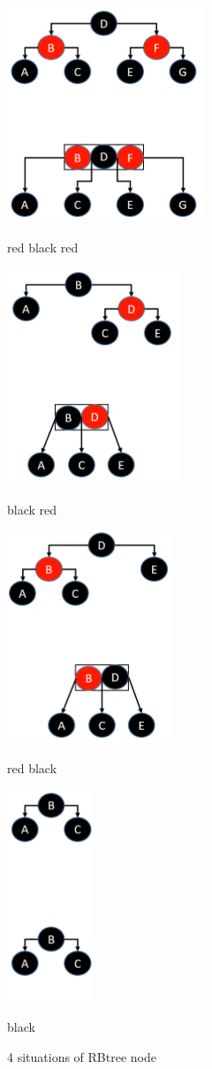\documentclass{article}
\begin{document}
\begin{figure}[htbp]
    \centering

    \begin{minipage}{0.49\linewidth}
        \centering
        \includegraphics[height = 90 pt]{rbr.png}
        \caption{red black red}
        \label{rbr}
    \end{minipage}
    \begin{minipage}{0.49\linewidth}
        \centering
        \includegraphics[height = 90 pt]{br.png}
        \caption{black red}
        \label{br}
    \end{minipage}

    \begin{minipage}{0.49\linewidth}
        \centering
        \includegraphics[height = 90 pt]{rb.png}
        \caption{red black}
        \label{rb}
    \end{minipage}
    \begin{minipage}{0.49\linewidth}
        \centering
        \includegraphics[height = 90 pt]{b.png}
        \caption{black}
        \label{b}
    \end{minipage}

    \caption{4 situations of RBtree node}
    \label{RBtree_Classification}
\end{figure}
\end{document}
